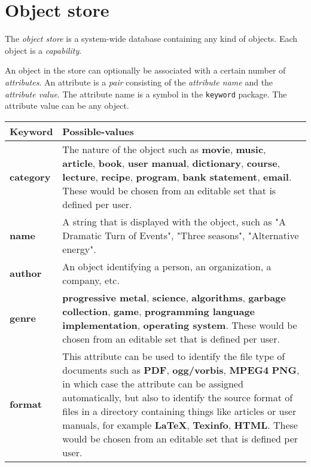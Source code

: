 \chapter{Object store}
\label{chap-object-store}

The \emph{object store} is a system-wide database containing
any kind of objects.  Each object is a \emph{capability}. 

An object in the store can optionally be associated with a certain
number of \emph{attributes}.  An attribute is a \emph{pair} consisting
of the \emph{attribute name} and the \emph{attribute value}.  The
attribute name is a symbol in the \texttt{keyword} package.  The
attribute value can be any object. 

\begin{tabularx}{\linewidth}%
{|>{\setlength\hsize{.2\hsize}}X|%
  >{\setlength\hsize{.8\hsize}}X|}
\hline
Keyword & Possible-values\\
\hline\hline
\textbf{category} &

The nature of the object such
as \textbf{movie}, \textbf{music}, \textbf{article}, \textbf{book}, \textbf{user
manual}, \textbf{dictionary}, \textbf{course}, \textbf{lecture},
\textbf{recipe}, \textbf{program}, \textbf{bank statement},
\textbf{email}.  These would be chosen from an
editable set that is defined per user.\\
\hline
\textbf{name} &

A string that is displayed with the object, such as "A Dramatic
Turn of Events", "Three seasons", "Alternative energy".\\
\hline
\textbf{author} &

An object identifying a person, an organization, a company,
etc. \\
\hline
\textbf{genre} &

\textbf{progressive
metal}, \textbf{science}, \textbf{algorithms}, \textbf{garbage
collection}, \textbf{game}, \textbf{programming language
implementation}, \textbf{operating system}.  These would be
chosen from an editable set that is defined per user.\\
\hline
\textbf{format} &

This attribute can be used to identify the file type of documents such
as \textbf{PDF}, \textbf{ogg/vorbis}, \textbf{MPEG4} \textbf{PNG}, in
which case the attribute can be assigned automatically, but also to
identify the source format of files in a directory containing
things like articles or user manuals, for
example \textbf{LaTeX}, \textbf{Texinfo}, \textbf{HTML}.  These would
be chosen from an editable set that is defined per user. \\
\hline
\end{tabularx}

